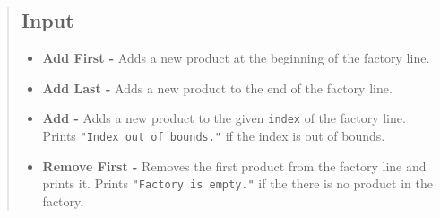 \documentclass[10pt]{article}
\begin{document}
\begin{quote}
\subsection{Input}




\begin{itemize}
    
    \item \textbf{Add First - } Adds a new product at the beginning of the factory line. \hfill \\ [10pt]
    \vspace{7pt}
    
    \item \textbf{Add Last - } Adds a new product to the end of the factory line. \hfill \\ [10pt]
    \vspace{7pt}
    
    \item \textbf{Add - } Adds a new product to the given \texttt{index} of the factory line. Prints \verb|"Index out of bounds."| if the index is out of bounds.   \hfill \\ [10pt]
    \vspace{7pt}
    
    \item \textbf{Remove First - } Removes the first product from the factory line and prints it. Prints \verb|"Factory is empty."| if the there is no product in the factory. \hfill \\ [10pt]
    \vspace{7pt}
    

\end{itemize}
\end{quote}
\end{document}
